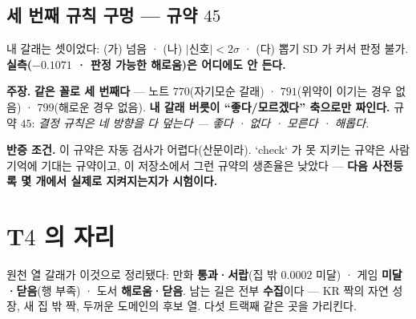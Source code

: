 \documentclass[10pt,a4paper]{article}
\newcommand{\claim}[2]{\begin{claimbox}\textbf{주장.} #1\par\smallskip
  \textcolor{gray!70}{\textbf{반증 조건.} #2}\end{claimbox}}
\begin{document}
\subsection*{세 번째 규칙 구멍 --- 규약 $45$}

내 갈래는 셋이었다: (가) 넘음 · (나) $|$신호$| < 2\sigma$ · (다) 뽑기 SD 가 커서
판정 불가. \textbf{실측($-0.1071$ · 판정 가능한 해로움)은 어디에도 안 든다.}

\claim{\textbf{같은 꼴로 세 번째다} --- 노트 $770$(자기모순 갈래) · $791$(위약이
이기는 경우 없음) · $799$(해로운 경우 없음). \textbf{내 갈래 버릇이
``좋다/모르겠다'' 축으로만 짜인다.} 규약 $45$: \emph{결정 규칙은 네 방향을 다
덮는다 --- 좋다 · 없다 · 모른다 · 해롭다.}}
{이 규약은 자동 검사가 어렵다(산문이라). `check` 가 못 지키는 규약은 사람 기억에
기대는 규약이고, 이 저장소에서 그런 규약의 생존율은 낮았다 --- \textbf{다음
사전등록 몇 개에서 실제로 지켜지는지가 시험이다.}}

\section{T$4$ 의 자리}

원천 열 갈래가 이것으로 정리됐다: 만화 \textbf{통과·서랍}(집 밖 $0.0002$ 미달) ·
게임 \textbf{미달·닫음}(행 부족) · 도서 \textbf{해로움·닫음}. 남는 길은 전부
\textbf{수집}이다 --- KR 짝의 자연 성장, 새 집 밖 짝, 두꺼운 도메인의 후보 열.
다섯 트랙째 같은 곳을 가리킨다.
\end{document}
